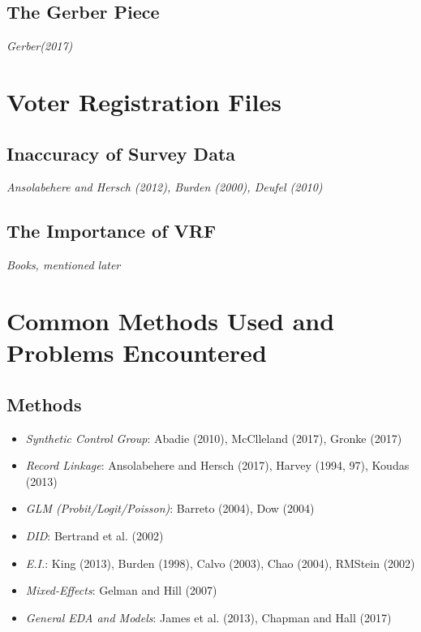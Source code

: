 \documentclass[12pt,twoside]{reedthesis}
\providecommand{\tightlist}{%
  \setlength{\itemsep}{0pt}\setlength{\parskip}{0pt}}
\begin{document}
  \subsection{The Gerber Piece}\label{the-gerber-piece}
  
  \emph{Gerber(2017)}
  
  \section{Voter Registration Files}\label{voter-registration-files}
  
  \subsection{Inaccuracy of Survey Data}\label{inaccuracy-of-survey-data}
  
  \emph{Ansolabehere and Hersch (2012), Burden (2000), Deufel (2010)}
  
  \subsection{The Importance of VRF}\label{the-importance-of-vrf}
  
  \emph{Books, mentioned later}
  
  \section{Common Methods Used and Problems
  Encountered}\label{common-methods-used-and-problems-encountered}
  
  \subsection{Methods}\label{methods}
  
  \begin{itemize}
  \tightlist
  \item
    \emph{Synthetic Control Group}: Abadie (2010), McClleland (2017),
    Gronke (2017)
  \item
    \emph{Record Linkage}: Ansolabehere and Hersch (2017), Harvey (1994,
    97), Koudas (2013)
  \item
    \emph{GLM (Probit/Logit/Poisson)}: Barreto (2004), Dow (2004)
  \item
    \emph{DID}: Bertrand et al. (2002)
  \item
    \emph{E.I.}: King (2013), Burden (1998), Calvo (2003), Chao (2004),
    RMStein (2002)
  \item
    \emph{Mixed-Effects}: Gelman and Hill (2007)
  \item
    \emph{General EDA and Models}: James et al. (2013), Chapman and Hall
    (2017)
  \end{itemize}
  
\end{document}
